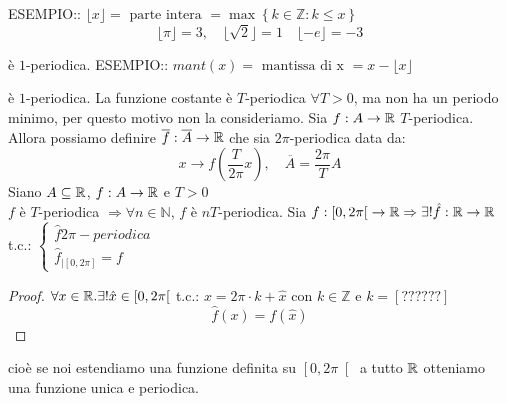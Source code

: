ESEMPIO:: $\lfloor x \rfloor = \text{ parte intera } = \max\left\{k\in\mathbb{Z}:k\le x\right\}$
$$\lfloor \pi \rfloor=3, \quad \lfloor \sqrt{2} \rfloor = 1 \quad \lfloor -e \rfloor = -3 $$
\begin{center}
\end{center}
è $1$-periodica.
ESEMPIO:: $mant(x)=\text{ mantissa di x } = x- \lfloor x \rfloor$
\begin{center}
\end{center}
è $1$-periodica.
\observation
La funzione costante è $T$-periodica $\forall T>0$, ma non ha un periodo minimo, per questo motivo non la consideriamo.
\observation
Sia $f:A\to \mathbb{R}$ $T$-periodica. Allora possiamo definire $\overline{f}:\overline{A}\to \mathbb{R}$ che sia $2\pi$-periodica data da:
$$x\to f\left(\frac{T}{2\pi}x\right),\quad \overline{A}=\frac{2\pi}{T}A$$
\proposition
Siano $A\subseteq \mathbb{R}$, $f:A\to \mathbb{R}$ e $T>0$\\
$f$ è $T$-periodica $\Rightarrow \forall n\in\mathbb{N}$, $f$ è $nT$-periodica.
\proposition
Sia $f:\left[0,2\pi\right[\to \mathbb{R} \Rightarrow \exists ! \hat{f}: \mathbb{R}\to \mathbb{R}$ t.c.: $\left\{\begin{matrix} \hat{f} 2\pi-periodica\\\hat{f}_{\left|\left[0,2\pi\right]\right.}=f\end{matrix}\right.$ 
\begin{proof}
	$\forall x\in \mathbb{R}. \exists ! \hat{x}\in\left[0,2\pi\right[$ t.c.: $x=2\pi\cdot k+\hat{x}$ con $k\in\mathbb{Z}$ e $k=\left[??????\right]$\\
	$$\hat{f}(x)=f(\hat{x})$$
\end{proof}
cioè se noi estendiamo una funzione definita su $\left[0,2\pi\right[$ a tutto $ \mathbb{R}$ otteniamo una funzione unica e periodica.
